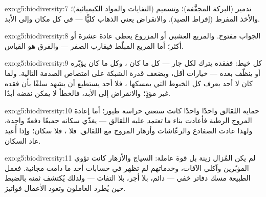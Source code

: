 \begin{solution}{exo:g5:biodiversity:7}
تدمير  (البركة المجفَّفة)؛ وتسميم  (النفايات والمواد
الكيميائية)؛ والأخذ المفرط (إفراط الصيد). والانقراض يعني الذهاب
كليًّا --- في كل مكان وإلى الأبد.
\end{solution}

\begin{solution}{exo:g5:biodiversity:8}
الجواب مفتوح. والمربع العشبي أو المزروع يعطي عادة عشرة  أو
أكثر؛ أما المربع المبلّط فيقارب الصفر --- والفرق هو القياس.
\end{solution}

\begin{solution}{exo:g5:biodiversity:9}
كل  خيط: ففقده يترك لكل جار --- كل ما كان ، وكل ما كان
يؤبّره أو ينظّف بعده --- خيارات أقل، ويضعف قدرة الشبكة على امتصاص
الصدمة التالية. ولما كان لا أحد يعرف كل الخيوط التي يمسكها ،
فلا أحد يستطيع أن يشهد سلفًا بأن فقده غير مؤذٍ؛ والانقراض إلى
الأبد، فالخطأ لا يمكن نقضه أبدًا.
\end{solution}

\begin{solution}{exo:g5:biodiversity:10}
حماية اللقالق واحدًا واحدًا كانت ستعني حراسة طيور؛ أما إعادة
المروج الرطبة فأعادت بناء ما \emph{تعتمد} عليه اللقالق --- 
يغذّي سكانه جميعًا دفعةً واحدة، ولهذا عادت الضفادع والرعّاشات
وأزهار المروج مع اللقالق. فلا ، فلا سكان؛ وإذا أُعيد 
عاد السكان.
\end{solution}

\begin{solution}{exo:g5:biodiversity:11}
لم يكن المُزال زينة بل قوة عاملة:  السياج والأزهار كانت تؤوي
المؤبّرين وآكلي الآفات، وخدماتهم لم تظهر في حسابات أحد ما دامت
مجانية. فعمل الطبيعة مسك دفاتر خفي --- دائم، بلا أجر، بلا التفات
--- ولذلك يُكتشف ثمنه بالضبط حين يُطرد العاملون وتعود الأعمال
فواتيرَ.
\end{solution}
